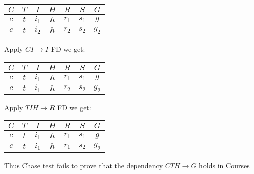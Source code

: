 %
%

\begin{tabular}{ c | c | c | c | c | c | c }
  $C$ & $T$ & $I$ & $H$ & $R$ & $S$ & $G$ \\ 
  \hline\hline
  $c$ & $t$ & $i_1$ & $h$ & $r_1$ & $s_1$ & $g$\\
  \hline 
  $c$ & $t$ & $i_2$ & $h$ & $r_2$ & $s_2$ & $g_2$\\
\end{tabular}

Apply $CT \rightarrow I$ FD we get:\\

\begin{tabular}{ c | c | c | c | c | c | c }
  $C$ & $T$ & $I$ & $H$ & $R$ & $S$ & $G$ \\ 
  \hline\hline
  $c$ & $t$ & $i_1$ & $h$ & $r_1$ & $s_1$ & $g$\\
  \hline 
  $c$ & $t$ & $i_1$ & $h$ & $r_2$ & $s_2$ & $g_2$\\
\end{tabular}

Apply $TIH \rightarrow R$ FD we get:\\

\begin{tabular}{ c | c | c | c | c | c | c }
  $C$ & $T$ & $I$ & $H$ & $R$ & $S$ & $G$ \\ 
  \hline\hline
  $c$ & $t$ & $i_1$ & $h$ & $r_1$ & $s_1$ & $g$\\
  \hline 
  $c$ & $t$ & $i_1$ & $h$ & $r_1$ & $s_2$ & $g_2$\\
\end{tabular}


Thus Chase test fails to prove that the dependency $CTH \rightarrow G$ holds in Courses